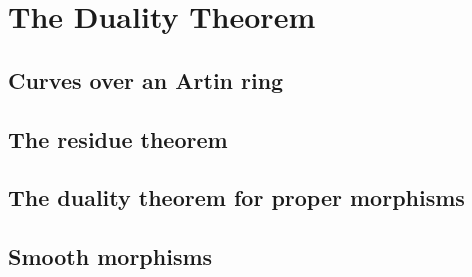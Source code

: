 \chapter{The Duality Theorem}
\section{Curves over an Artin ring}
\section{The residue theorem}
\section{The duality theorem for proper morphisms}
\section{Smooth morphisms}